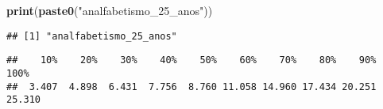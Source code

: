 \documentclass[
]{article}
\newenvironment{Shaded}{\begin{snugshade}}{\end{snugshade}}
\newcommand{\AttributeTok}[1]{\textcolor[rgb]{0.13,0.29,0.53}{#1}}
\newcommand{\DecValTok}[1]{\textcolor[rgb]{0.00,0.00,0.81}{#1}}
\newcommand{\FunctionTok}[1]{\textcolor[rgb]{0.13,0.29,0.53}{\textbf{#1}}}
\newcommand{\NormalTok}[1]{#1}
\newcommand{\SpecialCharTok}[1]{\textcolor[rgb]{0.81,0.36,0.00}{\textbf{#1}}}
\newcommand{\StringTok}[1]{\textcolor[rgb]{0.31,0.60,0.02}{#1}}
\begin{document}
\begin{Shaded}
\begin{Highlighting}[]
\FunctionTok{print}\NormalTok{(}\FunctionTok{paste0}\NormalTok{(}\StringTok{"analfabetismo\_25\_anos"}\NormalTok{))}
\end{Highlighting}
\end{Shaded}

\begin{verbatim}
## [1] "analfabetismo_25_anos"
\end{verbatim}

\begin{Shaded}
\end{Shaded}

\begin{verbatim}
##    10%    20%    30%    40%    50%    60%    70%    80%    90%   100% 
##  3.407  4.898  6.431  7.756  8.760 11.058 14.960 17.434 20.251 25.310
\end{verbatim}

\begin{Shaded}
\end{Shaded}
\end{document}
